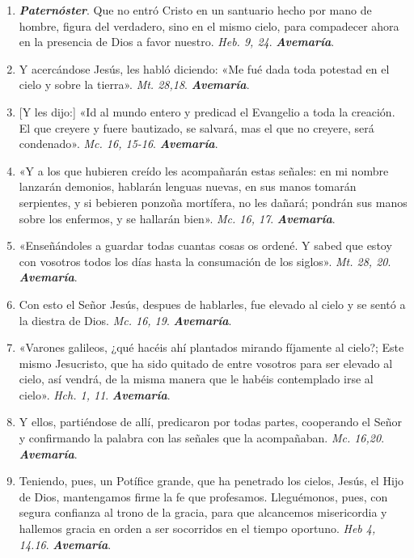 \documentclass[./rosary.tex]{subfiles}
\begin{document}
\begin{enumerate}
      \item \textbf{\emph{Paternóster}}. Que no entró Cristo en un santuario hecho por mano de hombre, figura del verdadero, sino en el mismo cielo, para compadecer ahora en
            la presencia de Dios a favor nuestro. \emph{Heb. 9, 24}. \textbf{\emph{Avemaría}}.

      \item Y acercándose Jesús, les habló diciendo: «Me fué dada toda potestad en el cielo y sobre la tierra». \emph{Mt. 28,18}. \textbf{\emph{Avemaría}}.

      \item {[Y les dijo:]} «Id al mundo entero y predicad el Evangelio a toda la creación. El que creyere y fuere bautizado,
            se salvará, mas el que no creyere, será condenado». \emph{Mc. 16, 15-16}. \textbf{\emph{Avemaría}}.

      \item «Y a los que hubieren creído les acompañarán estas señales: en mi nombre lanzarán demonios, hablarán lenguas nuevas, en sus manos tomarán serpientes,
            y si bebieren ponzoña mortífera, no les dañará; pondrán sus manos sobre los enfermos, y se hallarán bien». \emph{Mc. 16, 17}. \textbf{\emph{Avemaría}}.

      \item «Enseñándoles a guardar todas cuantas cosas os ordené. Y sabed que estoy con vosotros todos los días hasta la consumación de los siglos».
            \emph{Mt. 28, 20}. \textbf{\emph{Avemaría}}.

      \item Con esto el Señor Jesús, despues de hablarles, fue elevado al cielo y se sentó a la diestra de Dios. \emph{Mc. 16, 19}. \textbf{\emph{Avemaría}}.

      \item «Varones galileos, ¿qué hacéis ahí plantados mirando fíjamente al cielo?; Este mismo Jesucristo, que ha sido quitado de entre vosotros
            para ser elevado al cielo, así vendrá, de la misma manera que le habéis contemplado irse al cielo». \emph{Hch. 1, 11}. \textbf{\emph{Avemaría}}.

      \item Y ellos, partiéndose de allí, predicaron por todas partes, cooperando el Señor y confirmando la palabra con las señales que la acompañaban.
            \emph{Mc. 16,20}. \textbf{\emph{Avemaría}}.

      \item Teniendo, pues, un Potífice grande, que ha penetrado los cielos, Jesús, el Hijo de Dios, mantengamos firme la fe que profesamos. Lleguémonos, pues,
            con segura confianza al trono de la gracia, para que alcancemos misericordia y hallemos gracia en orden a ser socorridos en el tiempo oportuno.
            \emph{Heb 4, 14.16}. \textbf{\emph{Avemaría}}.


\end{enumerate}
\end{document}
